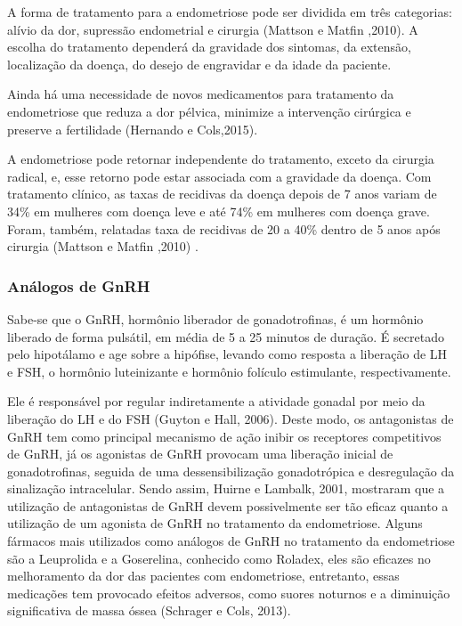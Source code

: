 \documentclass[12pt]{article} %
\begin{document}
A forma de tratamento para a endometriose pode ser dividida em três
categorias: alívio da dor, supressão endometrial e cirurgia (Mattson e
Matfin ,2010). A escolha do tratamento dependerá da gravidade dos
sintomas, da extensão, localização da doença, do desejo de engravidar
e da idade da paciente.

Ainda há uma necessidade de novos medicamentos para tratamento da
endometriose que reduza a dor pélvica, minimize a intervenção
cirúrgica e preserve a fertilidade (Hernando e Cols,2015).

A endometriose pode retornar independente do tratamento, exceto da
cirurgia radical, e, esse retorno pode estar associada com a gravidade
da doença. Com tratamento clínico, as taxas de recidivas da doença
depois de 7 anos variam de 34\% em mulheres com doença leve e até 74\%
em mulheres com doença grave. Foram, também, relatadas taxa de
recidivas de 20 a 40\% dentro de 5 anos após cirurgia (Mattson e
Matfin ,2010) .

\subsubsection{Análogos de GnRH}

Sabe-se que o GnRH, hormônio liberador de gonadotrofinas, é um
hormônio liberado de forma pulsátil, em média de 5 a 25 minutos de
duração. É secretado pelo hipotálamo e age sobre a hipófise, levando
como resposta a liberação de LH e FSH, o hormônio luteinizante e
hormônio folículo estimulante, respectivamente.

Ele é responsável por regular indiretamente a atividade gonadal por
meio da liberação do LH e do FSH (Guyton e Hall, 2006). Deste modo, os
antagonistas de GnRH tem como principal mecanismo de ação inibir os
receptores competitivos de GnRH, já os agonistas de GnRH provocam uma
liberação inicial de gonadotrofinas, seguida de uma dessensibilização
gonadotrópica e desregulação da sinalização intracelular. Sendo assim,
Huirne e Lambalk, 2001, mostraram que a utilização de antagonistas de
GnRH devem possivelmente ser tão eficaz quanto a utilização de um
agonista de GnRH no tratamento da endometriose.  Alguns fármacos mais
utilizados como análogos de GnRH no tratamento da endometriose são a
Leuprolida e a Goserelina, conhecido como Roladex, eles são eficazes %
no melhoramento da dor das pacientes com endometriose, entretanto,
essas medicações tem provocado efeitos adversos, como suores noturnos
e a diminuição significativa de massa óssea (Schrager e Cols, 2013).
\end{document}
